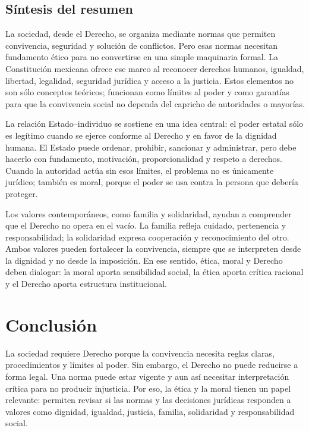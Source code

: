 \documentclass[
	spanish,
	letterpaper, oneside
]{article}
\begin{document}
\subsection{Síntesis del resumen}

La sociedad, desde el Derecho, se organiza mediante normas que permiten convivencia, seguridad y solución de conflictos. Pero esas normas necesitan fundamento ético para no convertirse en una simple maquinaria formal. La Constitución mexicana ofrece ese marco al reconocer derechos humanos, igualdad, libertad, legalidad, seguridad jurídica y acceso a la justicia. Estos elementos no son sólo conceptos teóricos; funcionan como límites al poder y como garantías para que la convivencia social no dependa del capricho de autoridades o mayorías.

La relación Estado--individuo se sostiene en una idea central: el poder estatal sólo es legítimo cuando se ejerce conforme al Derecho y en favor de la dignidad humana. El Estado puede ordenar, prohibir, sancionar y administrar, pero debe hacerlo con fundamento, motivación, proporcionalidad y respeto a derechos. Cuando la autoridad actúa sin esos límites, el problema no es únicamente jurídico; también es moral, porque el poder se usa contra la persona que debería proteger.

Los valores contemporáneos, como familia y solidaridad, ayudan a comprender que el Derecho no opera en el vacío. La familia refleja cuidado, pertenencia y responsabilidad; la solidaridad expresa cooperación y reconocimiento del otro. Ambos valores pueden fortalecer la convivencia, siempre que se interpreten desde la dignidad y no desde la imposición. En ese sentido, ética, moral y Derecho deben dialogar: la moral aporta sensibilidad social, la ética aporta crítica racional y el Derecho aporta estructura institucional.

\section{Conclusión}

La sociedad requiere Derecho porque la convivencia necesita reglas claras, procedimientos y límites al poder. Sin embargo, el Derecho no puede reducirse a forma legal. Una norma puede estar vigente y aun así necesitar interpretación crítica para no producir injusticia. Por eso, la ética y la moral tienen un papel relevante: permiten revisar si las normas y las decisiones jurídicas responden a valores como dignidad, igualdad, justicia, familia, solidaridad y responsabilidad social.
\end{document}
